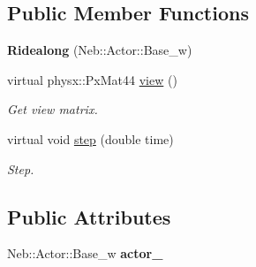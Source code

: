 \subsection*{Public Member Functions}
\begin{DoxyCompactItemize}
\item 
\hypertarget{classNeb_1_1Camera_1_1View_1_1Ridealong_aaf5c6034735477249451271b7f0b348a}{{\bfseries Ridealong} (Neb\-::\-Actor\-::\-Base\-\_\-w)}\label{classNeb_1_1Camera_1_1View_1_1Ridealong_aaf5c6034735477249451271b7f0b348a}

\item 
\hypertarget{classNeb_1_1Camera_1_1View_1_1Ridealong_a2e5fe6754e72c5ca4fe7658beafce459}{virtual physx\-::\-Px\-Mat44 \hyperlink{classNeb_1_1Camera_1_1View_1_1Ridealong_a2e5fe6754e72c5ca4fe7658beafce459}{view} ()}\label{classNeb_1_1Camera_1_1View_1_1Ridealong_a2e5fe6754e72c5ca4fe7658beafce459}

\begin{DoxyCompactList}\small\item\em Get view matrix. \end{DoxyCompactList}\item 
virtual void \hyperlink{classNeb_1_1Camera_1_1View_1_1Ridealong_a11898b9a6acd7ca864c0a32f12ec6e12}{step} (double time)
\begin{DoxyCompactList}\small\item\em Step. \end{DoxyCompactList}\end{DoxyCompactItemize}
\subsection*{Public Attributes}
\begin{DoxyCompactItemize}
\item 
\hypertarget{classNeb_1_1Camera_1_1View_1_1Ridealong_a6de6424f683789941305dddd6fc07e7c}{Neb\-::\-Actor\-::\-Base\-\_\-w {\bfseries actor\-\_\-}}\label{classNeb_1_1Camera_1_1View_1_1Ridealong_a6de6424f683789941305dddd6fc07e7c}

\end{DoxyCompactItemize}


